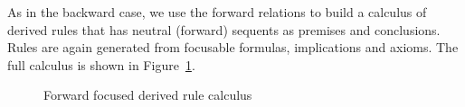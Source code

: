 As in the backward case, we use the forward relations to build a calculus of
derived rules that has neutral (forward) sequents as premises and
conclusions. Rules are again generated from focusable formulas, implications and
axioms. The full calculus is shown in Figure~\ref{fig:fwdderrulecalculus}.

\begin{figure}[h]
  \caption{Forward focused derived rule calculus}
  \label{fig:fwdderrulecalculus}
\end{figure}

